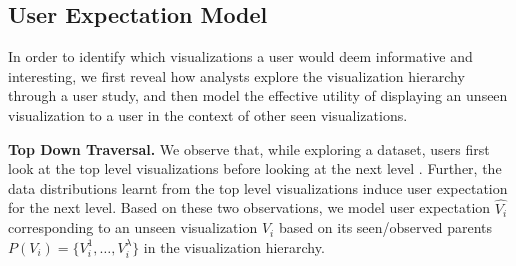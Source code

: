 \subsection{User Expectation Model}
In order to identify which visualizations a user would deem informative and interesting, we first reveal how analysts explore the visualization hierarchy through a user study, and then model the effective utility of displaying an unseen visualization to a user in the context of other seen visualizations. 
 
\textbf{Top Down Traversal.} We observe that, while exploring a dataset, users first look at the top level visualizations before looking at the next level \cite{Kim2017, Hullman2013}. Further, the data distributions learnt from the top level visualizations induce user expectation for the next level. Based on these two observations, we model user expectation $\hat{V_i}$ corresponding to an unseen visualization $V_i$ based on its seen/observed parents $P(V_i) = \{V_i^1, \ldots, V_i^\lambda\}$ in the visualization hierarchy. 

